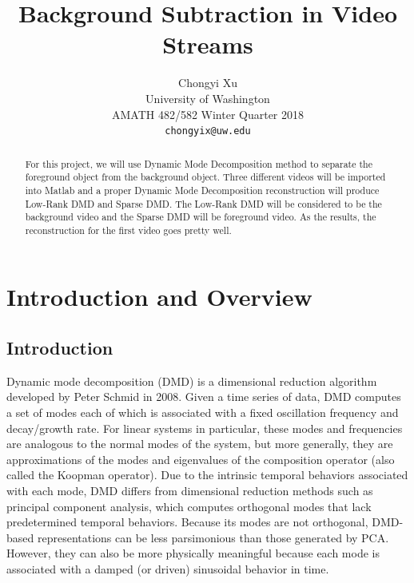 \documentclass[twoside,twocolumn]{article}
\title{\LARGE \bf
    Background Subtraction in Video Streams
    }
\author{ \parbox{3 in}{\centering Chongyi Xu \\
             University of Washington\\
             AMATH 482/582 Winter Quarter 2018\\
             {\tt\small chongyix@uw.edu}}
    }
\begin{document}
    \maketitle

    \begin{abstract}

    For this project, we will use Dynamic Mode Decomposition method to separate the foreground object from the background 
    object. Three different videos will be imported into Matlab and a proper Dynamic Mode Decomposition reconstruction will produce 
    Low-Rank DMD and Sparse DMD. The Low-Rank DMD will be considered to be the background video and the Sparse DMD will be 
    foreground video. As the results, the reconstruction for the first video goes pretty well.
        
    \end{abstract}

    \linespread{1.05} %
    \section{Introduction and Overview}
    \subsection{Introduction}
    Dynamic mode decomposition (DMD) is a dimensional reduction algorithm developed by Peter Schmid in 2008. Given a time series of 
    data, DMD computes a set of modes each of which is associated with a fixed oscillation frequency and decay/growth rate. 
    For linear systems in particular, these modes and frequencies are analogous to the normal modes of the system, but more 
    generally, they are approximations of the modes and eigenvalues of the composition operator (also called the Koopman 
    operator). Due to the intrinsic temporal behaviors associated with each mode, DMD differs from dimensional reduction
    methods such as principal component analysis, which computes orthogonal modes that lack predetermined temporal behaviors. 
    Because its modes are not orthogonal, DMD-based representations can be less parsimonious than those generated by PCA. 
    However, they can also be more physically meaningful because each mode is associated with a damped (or driven) sinusoidal 
    behavior in time.
\end{document}
